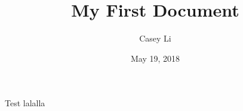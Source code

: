 \documentclass{article}
\title{My First Document}
\author{Casey Li}
\date{May 19, 2018}
\begin{document}
\maketitle
\thispagestyle{empty}

\clearpage
\setcounter{page}{1}
Test lalalla
\end{document}
